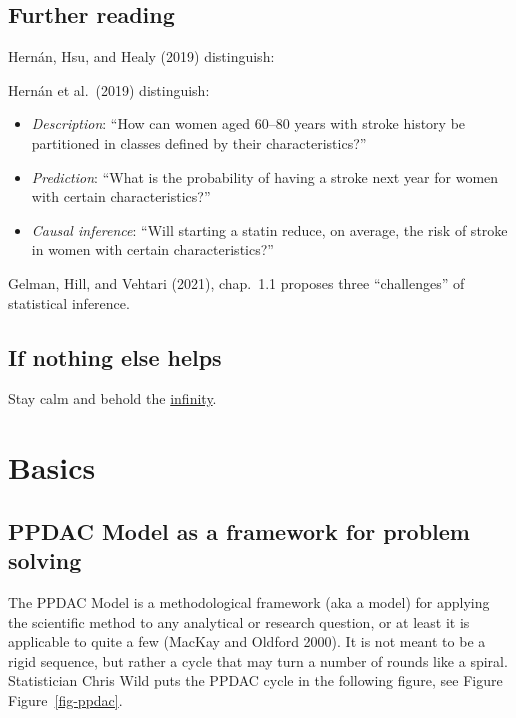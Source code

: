 \documentclass[
  letterpaper,
  DIV=11,
  numbers=noendperiod]{scrreprt}
\theoremstyle{definition}
\theoremstyle{definition}
\theoremstyle{remark}
\begin{document}
\hypertarget{further-reading}{%
\section{Further reading}\label{further-reading}}

Hernán, Hsu, and Healy (2019) distinguish:

Hernán et al.~(2019) distinguish:

\begin{itemize}
\item
  \emph{Description}: ``How can women aged 60--80 years with stroke
  history be partitioned in classes defined by their characteristics?''
\item
  \emph{Prediction}: ``What is the probability of having a stroke next
  year for women with certain characteristics?''
\item
  \emph{Causal inference}: ``Will starting a statin reduce, on average,
  the risk of stroke in women with certain characteristics?''
\end{itemize}

Gelman, Hill, and Vehtari (2021), chap.~1.1 proposes three
``challenges'' of statistical inference.

\hypertarget{if-nothing-else-helps}{%
\section{If nothing else helps}\label{if-nothing-else-helps}}

Stay calm and behold the
\href{https://upload.wikimedia.org/wikipedia/commons/thumb/6/69/Spiral_of_black_and_white_squares_10_till_repetition_spiraling_in.gif/600px-Spiral_of_black_and_white_squares_10_till_repetition_spiraling_in.gif?20170912223608}{infinity}.


\hypertarget{basics}{%
\chapter{Basics}\label{basics}}

\hypertarget{ppdac-model-as-a-framework-for-problem-solving}{%
\section{PPDAC Model as a framework for problem
solving}\label{ppdac-model-as-a-framework-for-problem-solving}}

The PPDAC Model is a methodological framework (aka a model) for applying
the scientific method to any analytical or research question, or at
least it is applicable to quite a few (MacKay and Oldford 2000). It is
not meant to be a rigid sequence, but rather a cycle that may turn a
number of rounds like a spiral. Statistician Chris Wild puts the PPDAC
cycle in the following figure, see Figure Figure~\ref{fig-ppdac}.
\end{document}
